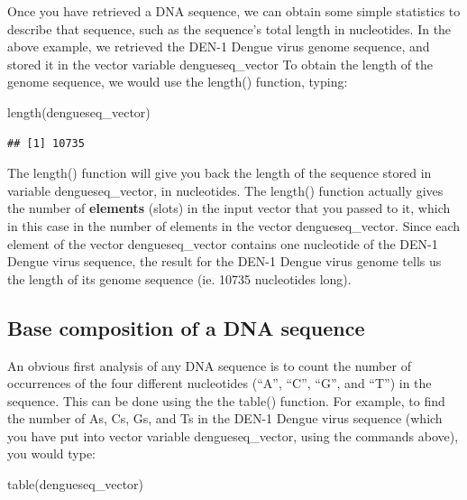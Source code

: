 \documentclass[
]{book}
\newenvironment{Shaded}{\begin{snugshade}}{\end{snugshade}}
\newcommand{\FunctionTok}[1]{\textcolor[rgb]{0.00,0.00,0.00}{#1}}
\newcommand{\NormalTok}[1]{#1}
\begin{document}
Once you have retrieved a DNA sequence, we can obtain some simple statistics to describe that sequence, such as the sequence's total length in nucleotides. In the above example, we retrieved the DEN-1 Dengue virus genome sequence, and stored it in the vector variable dengueseq\_vector To obtain the length of the genome sequence, we would use the length() function, typing:

\begin{Shaded}
\begin{Highlighting}[]
\FunctionTok{length}\NormalTok{(dengueseq\_vector)}
\end{Highlighting}
\end{Shaded}

\begin{verbatim}
## [1] 10735
\end{verbatim}

The length() function will give you back the length of the sequence stored in variable dengueseq\_vector, in nucleotides. The length() function actually gives the number of \textbf{elements} (slots) in the input vector that you passed to it, which in this case in the number of elements in the vector dengueseq\_vector. Since each element of the vector dengueseq\_vector contains one nucleotide of the DEN-1 Dengue virus sequence, the result for the DEN-1 Dengue virus genome tells us the length of its genome sequence (ie. 10735 nucleotides long).

\hypertarget{base-composition-of-a-dna-sequence}{%
\subsection{Base composition of a DNA sequence}\label{base-composition-of-a-dna-sequence}}

An obvious first analysis of any DNA sequence is to count the number of occurrences of the four different nucleotides (``A'', ``C'', ``G'', and ``T'') in the sequence. This can be done using the the table() function. For example, to find the number of As, Cs, Gs, and Ts in the DEN-1 Dengue virus sequence (which you have put into vector variable dengueseq\_vector, using the commands above), you would type:

\begin{Shaded}
\begin{Highlighting}[]
\FunctionTok{table}\NormalTok{(dengueseq\_vector)}
\end{Highlighting}
\end{Shaded}
\end{document}
